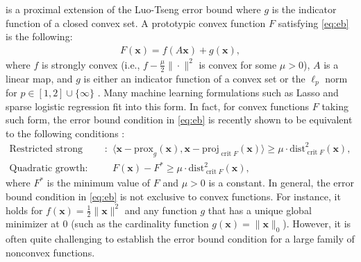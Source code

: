 \documentclass[leqno,onefignum,onetabnum]{siamart0516}
\newcommand{\ie}{{i.e.}\xspace}
\newcommand{\xb}{\mathbf{x}}
\newcommand{\dist}{\mathrm{dist}}
\newcommand{\prox}[2][\eta]{\mathrm{prox}_{#2}^{#1}}
\newcommand{\proj}[1]{\mathrm{proj}_{#1}}
\newcommand{\zero}{\mathbf{0}}
\newcommand{\crit}{\mathop{\mathrm{crit}}}
\newcommand{\inner}[2]{\langle #1, #2 \rangle}
\begin{document}
 is a proximal extension of the Luo-Tseng error bound \cite{LuoTseng93} where $g$ is the indicator function of a closed convex set. 
A prototypic convex function $F$ satisfying \eqref{eq:eb} is the following: 
\begin{align}
\label{eq:prototype}
F(\xb) = f(A\xb) + g(\xb),
\end{align}
where $f$ is  strongly convex (\ie, $f-\tfrac{\mu}{2}\|\cdot\|^2$ is convex for some $\mu > 0$), $A$ is a linear map, and $g$ is either an indicator function of a convex set \cite{LuoTseng93} or the $\ell_p$ norm for $p\in [1,2]\cup\{\infty\}$ \cite{EB2015}.  Many machine learning formulations such as Lasso and sparse logistic regression fit into this form. In fact, for convex functions $F$ taking such form, the error bound condition in \cref{eq:eb} is recently shown to be equivalent to the following conditions \cite{DrusvyatskiyLewis16,Zhang2016}:
\begin{align*}
\text{Restricted strong convexity}: ~ &\inner{ \xb - \prox[]{g}(\xb)}{\xb - \proj{\crit F}(\xb)} \ge \mu \cdot \dist_{\crit F}^2(\xb), \label{eq: rsc}\\
\text{Quadratic growth}: ~ &F(\xb) - F^* \ge \mu \cdot \dist_{\crit F}^2(\xb), %
\end{align*}
where $F^*$ is the minimum value of $F$ and $\mu>0$ is a constant. 
In general, the error bound condition in \cref{eq:eb} is not exclusive to convex functions. For instance, it holds for $f(\xb)= \tfrac{1}{2}\|\xb\|^2$ and any function $g$ that has a unique global minimizer at $0$ (such as the cardinality function $g(\xb) = \|\xb\|_0$). However, it is often quite challenging to establish the error bound condition for a large family of nonconvex functions. 



\end{document}
